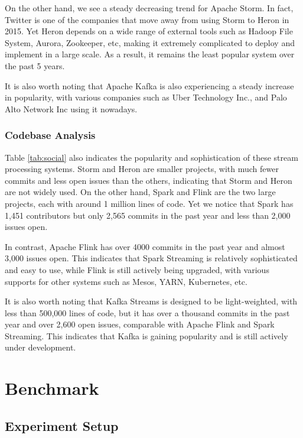 \documentclass[pdftex,twocolumn,10pt,letterpaper]{article}
\begin{document}
On the other hand, we see a steady decreasing trend for Apache Storm. In fact, Twitter is one of the companies that move away from using Storm to Heron in 2015. Yet Heron depends on a wide range of external tools such as Hadoop File System, Aurora, Zookeeper, etc, making it extremely complicated to deploy and implement in a large scale. As a result, it remains the least popular system over the past 5 years. 

It is also worth noting that Apache Kafka is also experiencing a steady increase in popularity, with various companies such as Uber Technology Inc., and Palo Alto Network Inc using it nowadays. 

\subsubsection{Codebase Analysis}

Table \ref{tab:social} also indicates the popularity and sophistication of these stream processing systems. Storm and Heron are smaller projects, with much fewer commits and less open issues than the others, indicating that Storm and Heron are not widely used. On the other hand, Spark and Flink are the two large projects, each with around 1 million lines of code. Yet we notice that Spark has 1,451 contributors but only 2,565 commits in the past year and less than 2,000 issues open. 

In contrast, Apache Flink has over 4000 commits in the past year and almost 3,000 issues open. This indicates that Spark Streaming is relatively sophisticated and easy to use, while Flink is still actively being upgraded, with various supports for other systems such as Mesos, YARN, Kubernetes, etc. 

It is also worth noting that Kafka Streams is designed to be light-weighted, with less than 500,000 lines of code, but it has over a thousand commits in the past year and over 2,600 open issues, comparable with Apache Flink and Spark Streaming. This indicates that Kafka is gaining popularity and is still actively under development. 


\section{Benchmark}

\subsection{Experiment Setup}
\end{document}
